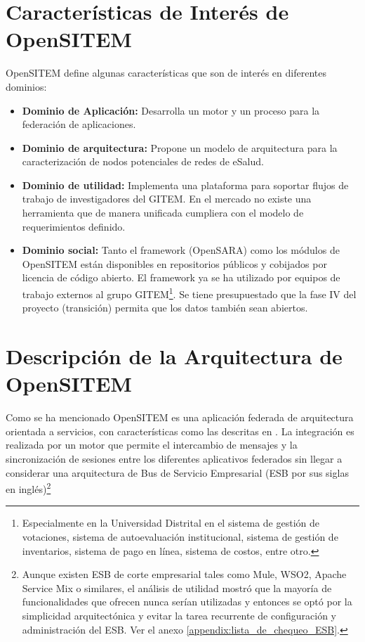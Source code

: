 \section{Características de Interés de OpenSITEM}


OpenSITEM define algunas características que son de interés en diferentes dominios:

\begin{itemize}
 \item \textbf{Dominio de Aplicación:} Desarrolla un motor y un proceso para la federación de aplicaciones. 
 \item \textbf{Dominio de arquitectura:} Propone un modelo de arquitectura para la caracterización de nodos potenciales de redes de eSalud.
 \item \textbf{Dominio de utilidad:} Implementa una plataforma para soportar flujos de trabajo de investigadores del GITEM. En el mercado no existe una herramienta que de manera unificada cumpliera con el modelo de requerimientos definido.
 \item \textbf{Dominio social:} Tanto el framework (OpenSARA) como los módulos de OpenSITEM están disponibles en repositorios públicos y cobijados por licencia de código abierto. El framework ya se ha utilizado por equipos de trabajo externos al grupo GITEM\footnote{Especialmente en la Universidad Distrital en el sistema de gestión de votaciones, sistema de autoevaluación institucional, sistema de gestión de inventarios, sistema de pago en línea, sistema de costos, entre otro. }. Se tiene presupuestado que la fase IV del proyecto (transición) permita que los datos también sean abiertos. 
\end{itemize}


\section{Descripción de la Arquitectura de OpenSITEM}

Como se ha mencionado OpenSITEM es una aplicación federada de arquitectura orientada a servicios, con características como las descritas en \cite{earl2017}. La integración es realizada por un motor que permite el intercambio de mensajes y la sincronización de sesiones entre los diferentes aplicativos federados sin llegar a considerar una arquitectura de Bus de Servicio Empresarial (ESB por sus siglas en inglés)\footnote{Aunque existen ESB de corte empresarial tales como Mule, WSO2, Apache Service Mix o similares, el análisis de utilidad mostró que la mayoría de funcionalidades que ofrecen nunca serían utilizadas y entonces se optó por la simplicidad arquitectónica y evitar la tarea recurrente de configuración y administración del ESB. Ver el anexo \ref{appendix:lista_de_chequeo_ESB}.} 

